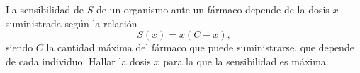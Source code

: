 {La sensibilidad de $S$ de un organismo ante un fármaco depende de la dosis $x$ suministrada según la relación
\[
S(x) = x(C-x),
\]
siendo $C$ la cantidad máxima del fármaco que puede suministrarse, que depende de cada individuo. 
Hallar la dosis $x$ para la que la sensibilidad es máxima. 
}
{
}
{
}
